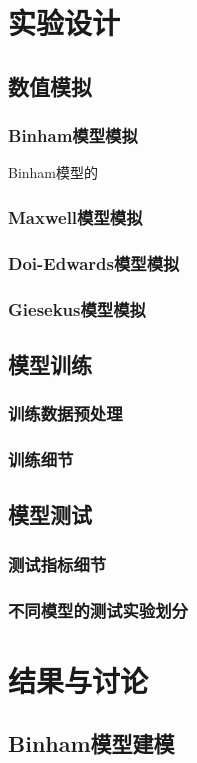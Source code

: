\section{实验设计}
\subsection{数值模拟}
\subsubsection{Binham模型模拟}
Binham模型的
\subsubsection{Maxwell模型模拟}
\subsubsection{Doi-Edwards模型模拟}
\subsubsection{Giesekus模型模拟}
\subsection{模型训练}
\subsubsection{训练数据预处理}
\subsubsection{训练细节}
\subsection{模型测试}
\subsubsection{测试指标细节}
\subsubsection{不同模型的测试实验划分}
\section{结果与讨论}
\subsection{Binham模型建模}
